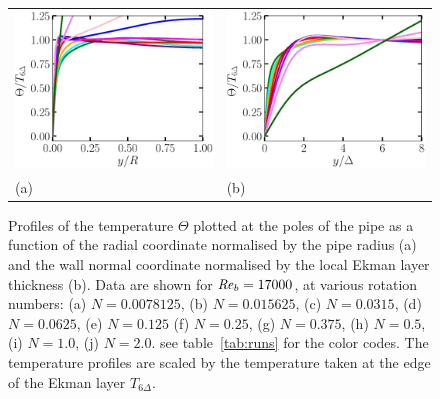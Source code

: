\documentclass[lineno]{jfm}
\begin{document}
        \begin{figure}
        \centering
                \begin{tabular}{ll}
                \includegraphics[width=5.cm]{Figures/ekman_profsyr_roty_500_T_alternative.eps} &
		\includegraphics[width=5.cm]{Figures/ekman_profsyd_roty_500_T_alternative.eps} \\
                (a) & (b) \\
                \end{tabular}
        \caption{
                Profiles of
		the temperature $\Theta$ plotted at the poles of the pipe 
		as a function of the radial coordinate normalised by the pipe radius (a) and the wall normal coordinate 
		normalised by the local Ekman layer thickness (b).  
                Data are shown for $\mbox{\textit{Re}}_b=17000$, at various rotation numbers:
                (a) $N = 0.0078125$,
                (b) $N = 0.015625$,
                (c) $N = 0.0315$,
                (d) $N = 0.0625$,
                (e) $N = 0.125$
                (f) $N = 0.25$,
                (g) $N = 0.375$,
                (h) $N = 0.5$,
                (i) $N = 1.0$,
                (j) $N = 2.0$.
                see table~\ref{tab:runs} for the color codes.
                The temperature profiles are scaled by the
		temperature taken at the edge of the Ekman layer $T_{6\Delta}$.
        }
                \label{fig:Ekman_T_6delta_500}
        \end{figure}
\end{document}
